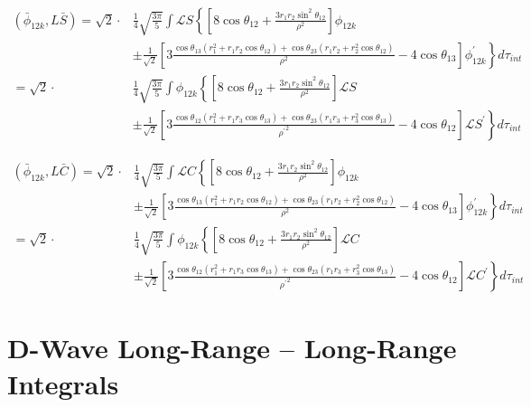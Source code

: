 \documentclass[Dissertation.tex]{subfiles}
\begin{document}
\begin{align}
\label{eq:DWavePhi3SBar}
\nonumber \left(\bar{\phi}_{12k},L \bar{S}\right) = \sqrt{2} \cdot & \frac{1}{4} \sqrt{\frac{3\pi}{5}} \int \mathscr{L}S \left\{ \left[ 8 \cos\theta_{12} + \frac{3 r_1 r_2 \sin^2\theta_{12}}{\rho^2} \right] \phi_{12k} \right. \\
\nonumber & \left. \pm \frac{1}{\sqrt{2}} \left[ 3 \frac{\cos\theta_{13}(r_1^2 + r_1 r_2 \cos\theta_{12}) + \cos\theta_{23}(r_1 r_2 + r_2^2 \cos\theta_{12})}{\rho^2} - 4 \cos\theta_{13} \right] \phi_{12k}^\prime  \right\} d\tau_{int} \\
\nonumber = \sqrt{2} \cdot & \frac{1}{4} \sqrt{\frac{3\pi}{5}} \int \phi_{12k} \left\{ \left[ 8 \cos\theta_{12} + \frac{3 r_1 r_2 \sin^2\theta_{12}}{\rho^2} \right] \mathscr{L}S \right. \\
& \pm \left. \frac{1}{\sqrt{2}} \left[ 3 \frac{\cos\theta_{12}(r_1^2 + r_1 r_3 \cos\theta_{13}) + \cos\theta_{23}(r_1 r_3 + r_3^2 \cos\theta_{13})}{{\rho^\prime}^2} - 4 \cos\theta_{12} \right] \mathscr{L}S^\prime \right\} d\tau_{int}
\end{align}

\begin{align}
\label{eq:DWavePhi3CBar}
\nonumber \left(\bar{\phi}_{12k},L \bar{C}\right) = \sqrt{2} \cdot & \frac{1}{4} \sqrt{\frac{3\pi}{5}} \int \mathscr{L}C \left\{ \left[ 8 \cos\theta_{12} + \frac{3 r_1 r_2 \sin^2\theta_{12}}{\rho^2} \right] \phi_{12k} \right. \\
\nonumber & \left. \pm \frac{1}{\sqrt{2}} \left[ 3 \frac{\cos\theta_{13}(r_1^2 + r_1 r_2 \cos\theta_{12}) + \cos\theta_{23}(r_1 r_2 + r_2^2 \cos\theta_{12})}{\rho^2} - 4 \cos\theta_{13} \right] \phi_{12k}^\prime  \right\} d\tau_{int} \\
\nonumber = \sqrt{2} \cdot & \frac{1}{4} \sqrt{\frac{3\pi}{5}} \int \phi_{12k} \left\{ \left[ 8 \cos\theta_{12} + \frac{3 r_1 r_2 \sin^2\theta_{12}}{\rho^2} \right] \mathscr{L}C \right. \\
& \pm \left. \frac{1}{\sqrt{2}} \left[ 3 \frac{\cos\theta_{12}(r_1^2 + r_1 r_3 \cos\theta_{13}) + \cos\theta_{23}(r_1 r_3 + r_3^2 \cos\theta_{13})}{{\rho^\prime}^2} - 4 \cos\theta_{12} \right] \mathscr{L}C^\prime \right\} d\tau_{int}
\end{align}


\section{D-Wave Long-Range -- Long-Range Integrals}
\label{sec:DWaveLongLong}
\end{document}
